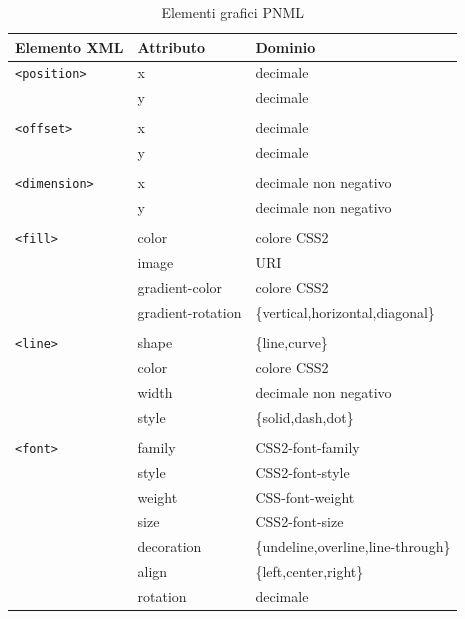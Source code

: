 \documentclass[italian,12pt]{book}
\begin{document}
\begin{table}
  \begin{tabular}{|l|ll|}
    \hline
    Elemento XML & Attributo & Dominio \\
    \hline
    {\tt<position>} & x & decimale \\
    & y & decimale \\
    & & \\
    {\tt<offset>}   & x & decimale \\
    & y & decimale \\
    & & \\
    {\tt<dimension>} & x & decimale non negativo \\
    & y & decimale non negativo \\
    & & \\
    {\tt<fill>}     & color & colore CSS2 \\
    & image & URI \\
    & gradient-color & colore CSS2 \\
    & gradient-rotation & \{vertical,horizontal,diagonal\} \\
    & & \\
    {\tt<line>}     & shape & \{line,curve\} \\
    & color & colore CSS2 \\
    & width & decimale non negativo \\
    & style & \{solid,dash,dot\} \\
    & & \\
    {\tt<font>}     & family & CSS2-font-family \\
    & style  & CSS2-font-style \\
    & weight & CSS-font-weight \\
    & size   & CSS2-font-size \\
    & decoration & \{undeline,overline,line-through\} \\
    & align  & \{left,center,right\} \\
    & rotation & decimale \\
    \hline
  \end{tabular}
  \caption{Elementi grafici PNML\label{PNML_elementi_grafici}}
\end{table}
\end{document}
